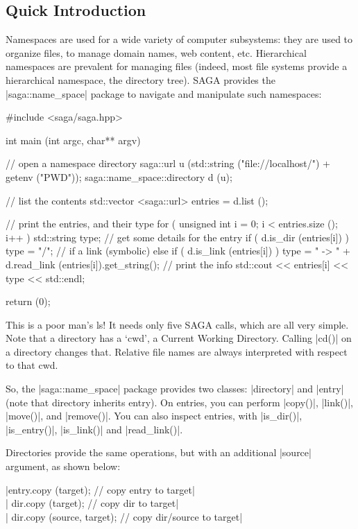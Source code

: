 
 \subsection{Quick Introduction}

  Namespaces are used for a wide variety of computer
  subsystems: they are used to organize files, to manage domain
  names, web content, etc.  Hierarchical namespaces are
  prevalent for managing files (indeed, most file systems provide
  a hierarchical namespace, the directory tree).  SAGA provides
  the |saga::name_space| package to navigate and manipulate such
  namespaces:

  \begin{mycode}[label=Navigating a name space]
  #include <saga/saga.hpp>

  int main (int argc, char** argv)
  {
    // open a namespace directory
    saga::url u (std::string ("file://localhost/") + getenv ("PWD"));
    saga::name_space::directory d (u);

    // list the contents
    std::vector <saga::url> entries = d.list ();

    // print the entries, and their type
    for ( unsigned int i = 0; i < entries.size (); i++ )
    {
      std::string type;
      // get some details for the entry
      if ( d.is_dir (entries[i]) )
      {
        type = "/";
      }
      // if a link (symbolic)
      else if ( d.is_link (entries[i]) )
      {
        type = " -> " + d.read_link (entries[i]).get_string();
      }
      // print the info
      std::cout << entries[i] << type << std::endl;
    }

  return (0);
  }
  \end{mycode}
   
  This is a poor man's ls!  It needs only five SAGA calls, which
  are all very simple.  Note that a directory has a `cwd', a
  Current Working Directory.  Calling |cd()| on a directory
  changes that.  Relative file names are always interpreted with
  respect to that cwd.

  So, the |saga::name_space| package provides two classes:
  |directory| and |entry| (note that directory inherits entry).
  On entries, you can perform |copy()|, |link()|, |move()|, and
  |remove()|.  You can also inspect entries, with |is_dir()|,
  |is_entry()|, |is_link()| and |read_link()|.  

  Directories provide the same operations, but with an additional
  |source| argument, as shown below:

  \shift |entry.copy (target);          // copy entry      to target|\\
  \shift |  dir.copy (target);          // copy dir        to target|\\
  \shift |  dir.copy (source, target);  // copy dir/source to target|

